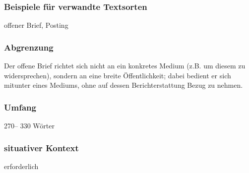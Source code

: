 \subsubsection{Beispiele für verwandte Textsorten}
offener Brief, Posting
\subsubsection{Abgrenzung}
Der offene Brief richtet sich nicht an ein konkretes Medium (z.B. um
diesem zu widersprechen), sondern an eine breite Öffentlichkeit; dabei
bedient er sich mitunter eines Mediums, ohne auf dessen Berichterstattung Bezug zu nehmen.
\subsubsection{Umfang} 270– 330 Wörter
\subsubsection{situativer Kontext} erforderlich